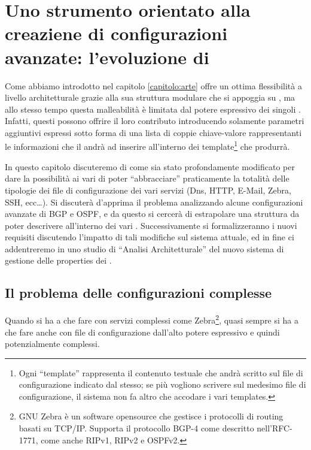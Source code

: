 \chapter{Uno strumento orientato alla creaziene di configurazioni avanzate: l'evoluzione di \visualnetkit{}}\label{capitolo:evoluzione_visualnetkit}

Come abbiamo introdotto nel capitolo \ref{capitolo:arte} \visualnetkit{} offre un ottima flessibilità a livello architetturale grazie alla sua struttura modulare che si appoggia su \plugin{}, ma allo stesso tempo questa malleabilità è limitata dal potere espressivo dei singoli \plugin{}. Infatti, questi possono offrire il loro contributo introducendo solamente parametri aggiuntivi espressi sotto forma di una lista di coppie chiave-valore rappresentanti le informazioni che il \plugin{} andrà ad inserire all'interno dei template\footnote{Ogni ``template'' rappresenta il contenuto testuale che andrà scritto sul file di configurazione indicato dal \plugin{} stesso; se più \plugin{} vogliono scrivere sul medesimo file di configurazione, il sistema non fa altro che accodare i vari templates.} che produrrà.

In questo capitolo discuteremo di come \visualnetkit{} sia stato profondamente modificato per dare la possibilità ai vari \plugin{} di poter ``abbracciare'' praticamente la totalità delle tipologie dei file di configurazione dei vari servizi (Dns, HTTP, E-Mail, Zebra, SSH, ecc\ldots). Si discuterà d'apprima il problema analizzando alcune configurazioni avanzate di BGP e OSPF, e da questo si cercerà di estrapolare una struttura da poter descrivere all'interno dei vari \plugin{}. Successivamente si formalizzeranno i nuovi requisiti discutendo l'impatto di tali modifiche sul sistema attuale, ed in fine ci addentreremo in uno studio di ``Analisi Architetturale'' del nuovo sistema di gestione delle properties dei \plugin{}.

\section{Il problema delle configurazioni complesse}
Quando si ha a che fare con servizi complessi come Zebra\footnote{GNU Zebra è un software opensource che gestisce i protocolli di routing basati su TCP/IP. Supporta il protocollo BGP-4 come descritto nell'RFC-1771, come anche RIPv1, RIPv2 e OSPFv2.}, quasi sempre si ha a che fare anche con file di configurazione dall'alto potere espressivo e quindi potenzialmente complessi.

